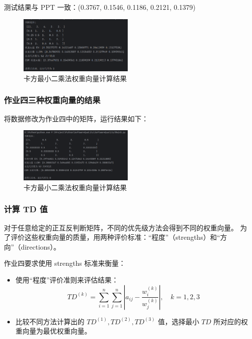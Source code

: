 测试结果与 PPT 一致：(0.3767, 0.1546, 0.1186, 0.2121, 0.1379)

\begin{figure}[H]
  \centering
  \includegraphics[width=0.5\textwidth]{img6/CSMtest2.png}
  \caption{卡方最小二乘法权重向量计算结果}
\end{figure}

\subsubsection{作业四三种权重向量的结果}
将数据修改为作业四中的矩阵，运行结果如下：

\begin{figure}[H]
  \centering
  \includegraphics[width=0.5\textwidth]{img6/Homework4.png}
  \caption{卡方最小二乘法权重向量计算结果}
\end{figure}

\subsubsection{计算 TD 值}

对于任意给定的正互反判断矩阵，不同的优先级方法会得到不同的权重向量。
为了评价这些权重向量的质量，用两种评价标准：“程度”（strengths）和“方向”（directions）。

作业四要求使用 strengths 标准来衡量：

\begin{itemize}
  \item 使用“程度”评价准则来评估结果：
  \[
  TD^{(k)} = \sum_{i=1}^n \sum_{j=1}^n \left| a_{ij} - \frac{w_i^{(k)}}{w_j^{(k)}} \right|, \quad k = 1,2,3
  \]
  \item 比较不同方法计算出的 \( TD^{(1)}, TD^{(2)}, TD^{(3)} \) 值，选择最小 \( TD \) 所对应的权重向量为最优权重向量。
\end{itemize}

